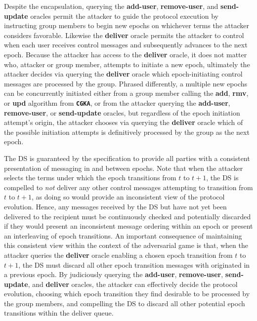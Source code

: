 Despite the encapsulation, querying the \textbf{add-user}, \textbf{remove-user}, and \textbf{send-update} oracles permit the attacker to guide the protocol execution by instructing group members to begin new epochs on whichever terms the attacker considers favorable.
Likewise the \textbf{deliver} oracle permits the attacker to control when each user receives control messages and subsequently advances to the next epoch.
Because the attacker has access to the \textbf{deliver} oracle, it does not matter who, attacker or group member, attempts to initiate a new epoch, ultimately the attacker decides via querying the \textbf{deliver} oracle which epoch-initiating control messages are processed by the group.
Phrased differently, a multiple new epochs can be concurrently initiated either from a group member calling the \textbf{add}, \textbf{rmv}, or \textbf{upd} algorithm from \textbf{\texttt{CGKA}}, or from the attacker querying the \textbf{add-user}, \textbf{remove-user}, or \textbf{send-update} oracles, but regardless of the epoch initiation attempt's origin, the attacker chooses via querying the \textbf{deliver} oracle which of the possible initiation attempts is definitively processed by the group as the next epoch.

The DS is guaranteed by the  specification to provide all parties with a consistent presentation of messaging in and between epochs.
Note that when the attacker selects the terms under which the epoch transitions from \(t\) to \(t+1\), the DS is compelled to \emph{not} deliver any other control messages attempting to transition from \(t\) to \(t+1\), as doing so would provide an inconsistent view of the protocol evolution.
Hence, any messages received by the DS but have not yet been delivered to the recipient must be continuously checked and potentially discarded if they would present an inconsistent message ordering within an epoch or present an interleaving of epoch transitions.
An important consequence of maintaining this consistent view within the context of the adversarial  game is that, when the attacker queries the \textbf{deliver} oracle enabling a chosen epoch transition from \(t\) to \(t+1\), the DS must discard all other epoch transition messages with originated in a previous epoch.
By judiciously querying the \textbf{add-user}, \textbf{remove-user}, \textbf{send-update}, and \textbf{deliver} oracles, the attacker can effectively decide the protocol evolution, choosing which epoch transition they find desirable to be processed by the group members, and compelling the DS to discard all other potential epoch transitions within the deliver queue.

